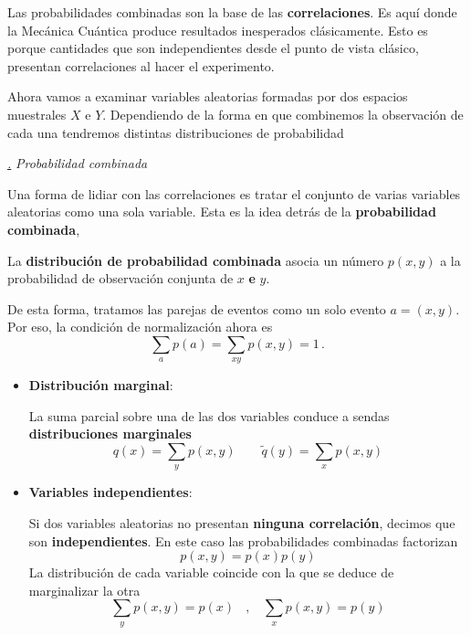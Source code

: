 \documentclass[a4paper,11pt]{book} %
\numberwithin{equation}{chapter}
\def\subsubiContadorIt{\par\addtocounter{subsubsection}{1}\underline{\it\thesubsubsection.}\hskip0.5cm \setcounter{subsubsubsectionIt}{0}}
\newcommand{\SubsubiIt}[1]{
		\subsubiContadorIt \textit{#1}
	}
\newcounter{subsubsubsectionIt}[subsubsection]
\begin{document}
Las probabilidades combinadas son la base de las \textbf{correlaciones}. Es aquí donde la Mecánica Cuántica produce resultados inesperados clásicamente. Esto es porque cantidades que son independientes desde el punto de vista clásico, presentan correlaciones al hacer el experimento. 

Ahora vamos a examinar variables aleatorias formadas por dos espacios muestrales $X$ e $Y$. Dependiendo de la forma en que combinemos la observación de cada una tendremos distintas distribuciones de probabilidad

			\SubsubiIt{Probabilidad combinada}

Una forma de lidiar con las correlaciones es tratar el conjunto de varias variables aleatorias como una sola variable. Esta es la idea detrás de la \textbf{probabilidad combinada}, 

\begin{mybox_gray2}{}
La \textbf{distribución de probabilidad combinada} asocia un número $p(x,y)$ a la probabilidad de observación conjunta de $x$ \textbf{e} $y$. 

De esta forma, tratamos las parejas de eventos  como un solo evento  $a = (x,y)$. Por eso, la condición de normalización ahora es 
	\begin{equation}
	\sum_a p(a) = \sum_{xy} p(x,y) = 1\, .
	\end{equation}
\end{mybox_gray2}

\begin{itemize}
	\item \textbf{Distribución marginal}:
	
	La suma parcial sobre una de las dos variables conduce a sendas \textbf{distribuciones marginales}
		\begin{equation}
		q(x) = \sum_{y} p(x,y) ~~~~~~~~~ \tilde q(y) = \sum_{x} p(x,y)
		\end{equation}

	\item \textbf{Variables independientes}:
	
	Si dos variables aleatorias no presentan \textbf{ninguna correlación}, decimos que son \textbf{independientes}. En este caso las probabilidades combinadas factorizan 
	\begin{equation}
	p(x,y) = p(x) p(y)
	\end{equation}
La distribución de cada variable coincide con la que se deduce de marginalizar la otra
	\begin{equation}
	\sum_y p(x,y) = p(x)~~~~,~~~~\sum_x p(x,y) = p(y)
	\end{equation}

\end{itemize}
\end{document}
